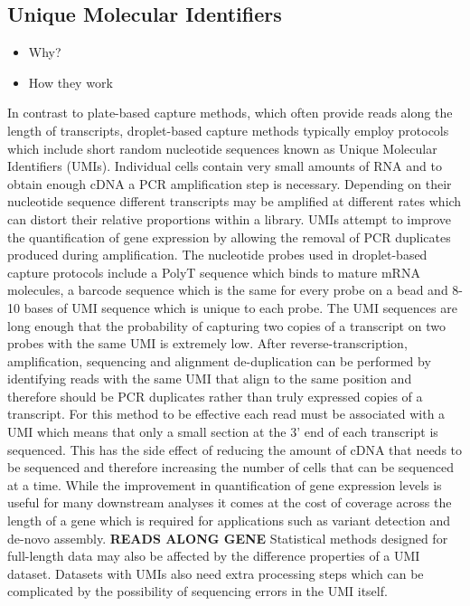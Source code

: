 \documentclass[11pt,a4paper,titlepage,twoside,openright]{style/unimelbthesis}
\theoremstyle{definition}
\theoremstyle{definition}
\theoremstyle{definition}
\theoremstyle{remark}
\begin{document}
\begin{mainmatter}
\hypertarget{unique-molecular-identifiers}{%
\subsection{Unique Molecular Identifiers}\label{unique-molecular-identifiers}}

\begin{itemize}
\tightlist
\item
  Why?
\item
  How they work
\end{itemize}

In contrast to plate-based capture methods, which often provide reads along the length of transcripts, droplet-based capture methods typically employ protocols which include short random nucleotide sequences known as Unique Molecular Identifiers (UMIs). Individual cells contain very small amounts of RNA and to obtain enough cDNA a PCR amplification step is necessary. Depending on their nucleotide sequence different transcripts may be amplified at different rates which can distort their relative proportions within a library. UMIs attempt to improve the quantification of gene expression by allowing the removal of PCR duplicates produced during amplification. The nucleotide probes used in droplet-based capture protocols include a PolyT sequence which binds to mature mRNA molecules, a barcode sequence which is the same for every probe on a bead and 8-10 bases of UMI sequence which is unique to each probe. The UMI sequences are long enough that the probability of capturing two copies of a transcript on two probes with the same UMI is extremely low. After reverse-transcription, amplification, sequencing and alignment de-duplication can be performed by identifying reads with the same UMI that align to the same position and therefore should be PCR duplicates rather than truly expressed copies of a transcript. For this method to be effective each read must be associated with a UMI which means that only a small section at the 3' end of each transcript is sequenced. This has the side effect of reducing the amount of cDNA that needs to be sequenced and therefore increasing the number of cells that can be sequenced at a time. While the improvement in quantification of gene expression levels is useful for many downstream analyses it comes at the cost of coverage across the length of a gene which is required for applications such as variant detection and de-novo assembly. \textbf{READS ALONG GENE} Statistical methods designed for full-length data may also be affected by the difference properties of a UMI dataset. Datasets with UMIs also need extra processing steps which can be complicated by the possibility of sequencing errors in the UMI itself.


\end{mainmatter}
\end{document}
